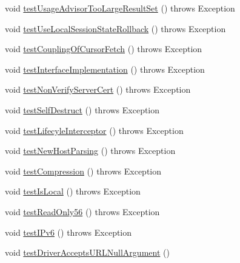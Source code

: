 \begin{DoxyCompactItemize}
\item 
void \mbox{\hyperlink{classtestsuite_1_1simple_1_1_connection_test_a169f5501b8761483ee76515dbf74cb88}{test\+Usage\+Advisor\+Too\+Large\+Result\+Set}} ()  throws Exception 
\item 
void \mbox{\hyperlink{classtestsuite_1_1simple_1_1_connection_test_afb4fb6217aa0ef099d610a92a8be2bfb}{test\+Use\+Local\+Session\+State\+Rollback}} ()  throws Exception 
\item 
void \mbox{\hyperlink{classtestsuite_1_1simple_1_1_connection_test_a64a129c95efd45055e9abf405d3eb5b1}{test\+Coupling\+Of\+Cursor\+Fetch}} ()  throws Exception 
\item 
void \mbox{\hyperlink{classtestsuite_1_1simple_1_1_connection_test_ae0d18c12f2bca2f80cf011479822713e}{test\+Interface\+Implementation}} ()  throws Exception 
\item 
void \mbox{\hyperlink{classtestsuite_1_1simple_1_1_connection_test_a728791cc1f2724f19b673701ea51362d}{test\+Non\+Verify\+Server\+Cert}} ()  throws Exception 
\item 
void \mbox{\hyperlink{classtestsuite_1_1simple_1_1_connection_test_af87c212adeb44aa3ab686c638bcc922d}{test\+Self\+Destruct}} ()  throws Exception 
\item 
void \mbox{\hyperlink{classtestsuite_1_1simple_1_1_connection_test_ade9f97f7bb0875ac302b464bf8a00e40}{test\+Lifecyle\+Interceptor}} ()  throws Exception 
\item 
void \mbox{\hyperlink{classtestsuite_1_1simple_1_1_connection_test_a2def0e0f5805bc123f27ecfaa3e1bbd7}{test\+New\+Host\+Parsing}} ()  throws Exception 
\item 
void \mbox{\hyperlink{classtestsuite_1_1simple_1_1_connection_test_a22a442826a4f49a1fd5c67a310e296de}{test\+Compression}} ()  throws Exception 
\item 
void \mbox{\hyperlink{classtestsuite_1_1simple_1_1_connection_test_ab0d2e15a6a5a5f0876ea643631a7ab96}{test\+Is\+Local}} ()  throws Exception 
\item 
void \mbox{\hyperlink{classtestsuite_1_1simple_1_1_connection_test_afa59da66108d892d7a6b0f91775127a5}{test\+Read\+Only56}} ()  throws Exception 
\item 
void \mbox{\hyperlink{classtestsuite_1_1simple_1_1_connection_test_aaac71a7d7f1811f8ca555a3f8fb2573b}{test\+I\+Pv6}} ()  throws Exception 
\item 
void \mbox{\hyperlink{classtestsuite_1_1simple_1_1_connection_test_a20b111f18ff6ab2b7d2d95578d3613e4}{test\+Driver\+Accepts\+U\+R\+L\+Null\+Argument}} ()

\end{DoxyCompactItemize}
